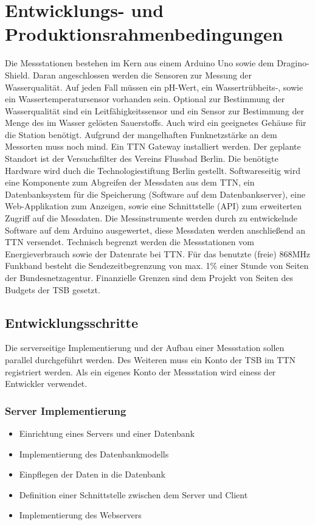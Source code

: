 \section{Entwicklungs- und Produktionsrahmenbedingungen}

Die Messstationen bestehen im Kern aus einem Arduino Uno sowie dem Dragino-Shield. Daran angeschlossen werden die Sensoren zur Messung der Wasserqualität. Auf jeden Fall müssen ein pH-Wert, ein Wassertrübheits-, sowie ein Wassertemperatursensor vorhanden sein. Optional zur Bestimmung der Wasserqualität sind ein Leitfähigkeitssensor und ein Sensor zur Bestimmung der Menge des im Wasser gelösten Sauerstoffs. Auch wird ein geeignetes Gehäuse für die Station benötigt.
Aufgrund der mangelhaften Funknetzstärke an dem Messorten muss noch mind. Ein TTN Gateway installiert werden. Der geplante Standort ist der Versuchsfilter des Vereins Flussbad Berlin. Die benötigte Hardware wird duch die Technologiestiftung Berlin gestellt.
Softwareseitig wird eine Komponente zum Abgreifen der Messdaten aus dem TTN, ein Datenbanksystem für die Speicherung (Software auf dem Datenbankserver), eine Web-Applikation zum Anzeigen, sowie eine Schnittstelle (API) zum erweiterten Zugriff auf die Messdaten. Die Messinstrumente werden durch zu entwickelnde Software auf dem Arduino ausgewertet, diese Messdaten werden anschließend an TTN versendet.
Technisch begrenzt werden die Messstationen vom Energieverbrauch sowie der Datenrate bei TTN. Für das benutzte (freie) 868MHz Funkband besteht die Sendezeitbegrenzung von max. 1\% einer Stunde von Seiten der Bundesnetzagentur.
Finanzielle Grenzen sind dem Projekt von Seiten des Budgets der TSB gesetzt.

\subsection{Entwicklungsschritte}

Die serverseitige Implementierung und der Aufbau einer Messstation sollen parallel durchgeführt werden. Des Weiteren muss ein Konto der TSB im TTN registriert werden. Als ein eigenes Konto der Messstation wird einess der Entwickler verwendet.

\subsubsection{Server Implementierung}
\begin{itemize}
	\item Einrichtung eines Servers und einer Datenbank
	\item Implementierung des Datenbankmodells
	\item Einpflegen der Daten in die Datenbank
	\item Definition einer Schnittstelle zwischen dem Server und Client
	\item Implementierung des Webservers
\end{itemize}

